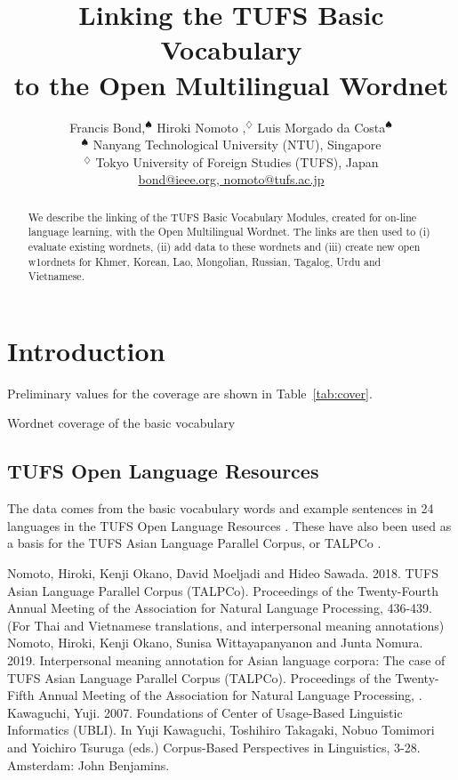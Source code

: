 \documentclass[11pt]{article}
\title{Linking the TUFS Basic Vocabulary \\ to the Open Multilingual Wordnet}
\author{
	Francis Bond,$^\spadesuit$ 
	Hiroki Nomoto ,$^\diamondsuit$
	Luis Morgado da Costa$^\spadesuit$\\
  $^\spadesuit$ Nanyang Technological University (NTU),  Singapore\\
  $^\diamondsuit$
  Tokyo University of Foreign Studies (TUFS), Japan \\
  \url{bond@ieee.org, nomoto@tufs.ac.jp} }
\date{}
\begin{document}
\maketitle
\begin{abstract}
We describe the linking of the TUFS Basic Vocabulary Modules, created for
on-line language learning, with the Open Multilingual Wordnet.  The
links are then used to (i) evaluate existing wordnets, (ii) add data
to these wordnets and (iii) create new open w1ordnets for Khmer,
Korean, Lao, Mongolian, Russian, Tagalog, Urdu and Vietnamese.


\end{abstract}
\section{Introduction}




Preliminary values for the coverage are shown in Table~\ref{tab:cover}.

\begin{table}
  \centering
  
  \caption{Wordnet coverage of the basic vocabulary}\label{tab:cover}
\end{table}


\subsection{TUFS Open Language Resources}


The data comes from the basic vocabulary words and example sentences
in 24 languages in the TUFS Open Language Resources
\citep{Kawaguchi:2007}.  These have also been used as a basis for the TUFS Asian Language
Parallel Corpus, or TALPCo \citep{}.

Nomoto, Hiroki, Kenji Okano, David Moeljadi and Hideo Sawada. 2018. TUFS Asian Language Parallel Corpus (TALPCo). Proceedings of the Twenty-Fourth Annual Meeting of the Association for Natural Language Processing, 436-439.
(For Thai and Vietnamese translations, and interpersonal meaning annotations)
Nomoto, Hiroki, Kenji Okano, Sunisa Wittayapanyanon and Junta
Nomura. 2019. Interpersonal meaning annotation for Asian language
corpora: The case of TUFS Asian Language Parallel Corpus
(TALPCo). Proceedings of the Twenty-Fifth Annual Meeting of the
Association for Natural Language Processing, .
Kawaguchi, Yuji. 2007. Foundations of Center of Usage-Based Linguistic
Informatics (UBLI). In Yuji Kawaguchi, Toshihiro Takagaki, Nobuo
Tomimori and Yoichiro Tsuruga (eds.) Corpus-Based Perspectives in
Linguistics, 3-28. Amsterdam: John Benjamins.
\end{document}
